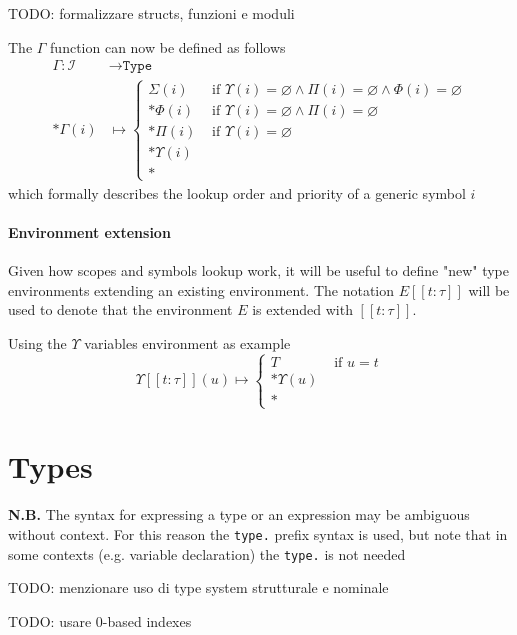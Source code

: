 \documentclass[11pt]{report}
\newcommand{\code}[1]{\texttt{\colorbox{gray!10}{#1}}}
\newcommand{\nb}[1]{\textbf{N.B. } #1}
\newcommand{\Id}{\mathcal{I}}
\newcommand{\Type}{\texttt{Type}}
\newcommand{\env}[1]{[\![#1]\!]}
\newcommand{\Env}{\Gamma}
\newcommand{\EnvVar}{\Upsilon}
\newcommand{\EnvConst}{\Pi}
\newcommand{\EnvFunc}{\Phi}
\newcommand{\EnvStucts}{\Sigma}
\theoremstyle{definition}
\newcommand{\comment}[1]{
	\parbox{0.9\linewidth}{\color{black!30}\small\sffamily #1}
}
\begin{document}
\comment{TODO: formalizzare structs, funzioni e moduli}

The $\Env$ function can now be defined as follows
\[
	\begin{split}
		\Env : \Id & \to \Type\\*
		\Env(i) & \mapsto \begin{cases}
			\EnvStucts(i) &\text{ if } \EnvVar(i)=\varnothing \land \EnvConst(i)=\varnothing \land \EnvFunc(i)=\varnothing \\*
			\EnvFunc(i) &\text{ if } \EnvVar(i)=\varnothing \land \EnvConst(i)=\varnothing \\*
			\EnvConst(i) &\text{ if } \EnvVar(i)=\varnothing \\*
			\EnvVar(i) & \\*
		\end{cases}
	\end{split}
\]
which formally describes the lookup order and priority of a generic symbol $i$

\paragraph{Environment extension} Given how scopes and symbols lookup work, it
will be useful to define "new" type environments extending an existing
environment. The notation $E\env{t:\tau}$ will be used to denote that the
environment $E$ is extended with $\env{t:\tau}$.

Using the $\EnvVar$ variables environment as example
\[
	\EnvVar\env{t:\tau}(u) \mapsto \begin{cases}
		T &\text{ if } u = t \\*
		\EnvVar(u) & \\*
	\end{cases}
\]

\newpage

\section{Types}

\nb{
	The syntax for expressing a type or an expression may be ambiguous without
	context. For this reason the \code{type.} prefix syntax is used, but note
	that in some contexts (e.g. variable declaration) the \code{type.} is not
	needed
}

\comment{TODO: menzionare uso di type system strutturale e nominale}

\comment{TODO: usare 0-based indexes}
\end{document}
